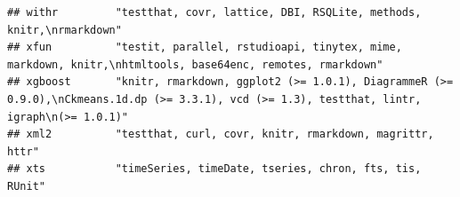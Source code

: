 \documentclass[]{article}
\begin{document}
\begin{verbatim}
## withr         "testthat, covr, lattice, DBI, RSQLite, methods, knitr,\nrmarkdown"                                                                                                                                                                                                                                                                                                                                                                                                                                                                                                                       
## xfun          "testit, parallel, rstudioapi, tinytex, mime, markdown, knitr,\nhtmltools, base64enc, remotes, rmarkdown"                                                                                                                                                                                                                                                                                                                                                                                                                                                                                 
## xgboost       "knitr, rmarkdown, ggplot2 (>= 1.0.1), DiagrammeR (>= 0.9.0),\nCkmeans.1d.dp (>= 3.3.1), vcd (>= 1.3), testthat, lintr, igraph\n(>= 1.0.1)"                                                                                                                                                                                                                                                                                                                                                                                                                                               
## xml2          "testthat, curl, covr, knitr, rmarkdown, magrittr, httr"                                                                                                                                                                                                                                                                                                                                                                                                                                                                                                                                  
## xts           "timeSeries, timeDate, tseries, chron, fts, tis, RUnit"                                                                                                                                                                                                                                                                                                                                                                                                                                                                                                                                   

\end{verbatim}
\end{document}
